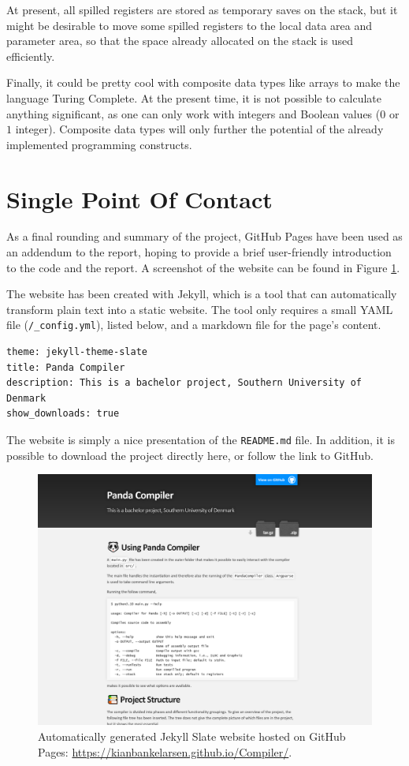At present, all spilled registers are stored as temporary saves on the stack, but it might be desirable to move some spilled registers to the local data area and parameter area, so that the space already allocated on the stack is used efficiently.

Finally, it could be pretty cool with composite data types like arrays to make the language Turing Complete. At the present time, it is not possible to calculate anything significant, as one can only work with integers and Boolean values ($0$ or $1$ integer). Composite data types will only further the potential of the already implemented programming constructs.


\section{Single Point Of Contact}
As a final rounding and summary of the project, GitHub Pages have been used as an addendum to the report, hoping to provide a brief user-friendly introduction to the code and the report. A screenshot of the website can be found in Figure \ref{fig:GitHub_Pages}.

The website has been created with Jekyll, which is a tool that can automatically transform plain text into a static website. The tool only requires a small YAML file (\texttt{/\_config.yml}), listed below, and a markdown file for the page's content.

\begin{verbatim}
theme: jekyll-theme-slate
title: Panda Compiler
description: This is a bachelor project, Southern University of Denmark
show_downloads: true
\end{verbatim}

The website is simply a nice presentation of the \texttt{README.md} file. In addition, it is possible to download the project directly here, or follow the link to GitHub.

\begin{figure}[H]
    \centering
    \includegraphics[width=1\textwidth]{misc/images/GitHub_Pages.png}
    \caption{Automatically generated Jekyll Slate website hosted on GitHub Pages: \url{https://kianbankelarsen.github.io/Compiler/}.}
    \label{fig:GitHub_Pages}
\end{figure}

